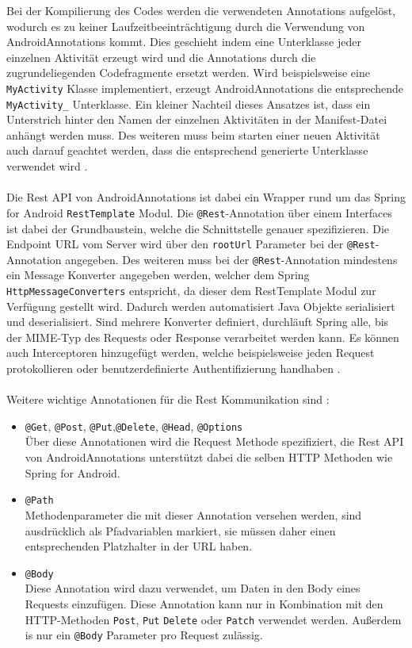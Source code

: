 Bei der Kompilierung des Codes werden die verwendeten Annotations aufgelöst, wodurch es zu keiner Laufzeitbeeinträchtigung durch die Verwendung von AndroidAnnotations kommt. Dies geschieht indem eine Unterklasse jeder einzelnen Aktivität erzeugt wird und die Annotations durch die zugrundeliegenden Codefragmente ersetzt werden. Wird beispielsweise eine \texttt{MyActivity} Klasse implementiert, erzeugt AndroidAnnotations die entsprechende \texttt{MyActivity\_} Unterklasse. Ein kleiner Nachteil dieses Ansatzes ist, dass ein Unterstrich hinter den Namen der einzelnen Aktivitäten in der Manifest-Datei anhängt werden muss. Des weiteren muss beim starten einer neuen Aktivität auch darauf geachtet werden, dass die entsprechend generierte Unterklasse verwendet wird \cite{annotation:spring}. 
\\\\
Die Rest API von AndroidAnnotations ist dabei ein Wrapper rund um das Spring for Android \texttt{RestTemplate} Modul. Die \texttt{@Rest}-Annotation über einem Interfaces ist dabei der Grundbaustein, welche die Schnittstelle genauer spezifizieren. Die Endpoint URL vom Server wird über den \texttt{rootUrl} Parameter bei der \texttt{@Rest}-Annotation angegeben. Des weiteren muss bei der \texttt{@Rest}-Annotation mindestens ein Message Konverter angegeben werden, welcher dem Spring \texttt{HttpMessageConverters} entspricht, da dieser dem RestTemplate Modul zur Verfügung gestellt wird. Dadurch werden automatisiert Java Objekte serialisiert und deserialisiert. Sind mehrere Konverter definiert, durchläuft Spring alle, bis der MIME-Typ des Requests oder Response verarbeitet werden kann. Es können auch Interceptoren hinzugefügt werden, welche beispielsweise jeden Request protokollieren oder benutzerdefinierte Authentifizierung handhaben \cite{annotation:rest}.
\\\\
Weitere wichtige Annotationen für die Rest Kommunikation sind \cite{annotation:rest}:
 
\begin{itemize}
	\item \texttt{@Get}, \texttt{@Post}, \texttt{@Put},\texttt{@Delete}, \texttt{@Head}, \texttt{@Options}\\
	Über diese Annotationen wird die Request Methode spezifiziert, die Rest API von AndroidAnnotations unterstützt dabei die selben HTTP Methoden wie Spring for Android.
	\item \texttt{@Path}\\
	Methodenparameter die mit dieser Annotation versehen werden, sind ausdrücklich als Pfadvariablen markiert, sie müssen daher einen entsprechenden Platzhalter in der URL haben.
	\item \texttt{@Body}\\
	Diese Annotation wird dazu verwendet, um Daten in den Body eines Requests einzufügen. Diese Annotation kann nur in Kombination mit den HTTP-Methoden \texttt{Post}, \texttt{Put} \texttt{Delete} oder \texttt{Patch} verwendet werden. Außerdem is nur ein \texttt{@Body} Parameter pro Request zulässig.
\end{itemize}

